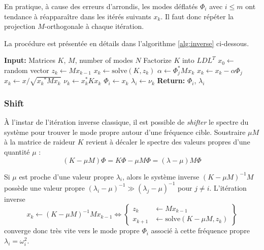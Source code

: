 \documentclass[12pt]{article}
\begin{document}
En pratique, à cause des erreurs d'arrondis, les modes déflatés $\Phi_i$ avec 
$i\leq m$ ont tendance à réapparaître dans les itérés suivants $x_k$. Il
faut donc répéter la projection $M$-orthogonale à chaque itération. 

La procédure est présentée en détails dans l'algorithme \ref{alg:inverse} 
ci-dessous.

\begin{algorithm}[H]
    \caption{Itération inverse avec déflation pour un problème généralisé $K\Phi = \omega^2 M \Phi$}
    \begin{algorithmic}[1]
    \State \textbf{Input:} Matrices $K$, $M$, number of modes $N$
    \State Factorize $K$ into $L D L^T$
     
        \State $ x_0 \gets $ random vector
         
            \State $z_k \gets M x_{k-1}$
            \State $x_k \gets \textrm{solve}(K, z_k)$
             
                \State $\alpha \gets \Phi_j^* M x_k$
                \State $x_k \gets x_k - \alpha \Phi_j$ 
            \EndFor
            \State $x_{k} \gets x / \sqrt{{x_k}^* M x_k}$ 
            \State $\nu_{k} \gets x_k^* K x_k$
        \EndFor
        \State $\Phi_i \gets x_k$ 
        \State $\lambda_i \gets \nu_k$ 
        \State \textbf{Return:} $\Phi_i$, $\lambda_i$
    \EndFor
    \end{algorithmic}
    \label{alg:inverse}
\end{algorithm}


\subsubsection{Shift}
À l'instar de l'itération inverse classique, il est possible de \textit{shifter}
le spectre du système pour trouver le mode propre autour d'une fréquence cible.
Soustraire $\mu M$ à la matrice de raideur $K$ revient à décaler le spectre des
valeurs propres d'une quantité $\mu$ :
\begin{equation}
    (K - \mu M) \Phi = K \Phi - \mu M \Phi = (\lambda - \mu) M \Phi
\end{equation}

Si $\mu$ est proche d'une valeur propre $\lambda_i$, alors le système inverse 
$(K - \mu M)^{-1} M $ possède une valeur propre 
$(\lambda_i - \mu)^{-1} \gg (\lambda_j - \mu)^{-1}$ pour $j \neq i$. 
L'itération inverse
\begin{equation}
    x_{k} \gets (K - \mu M)^{-1} M x_{k-1} \iff
    \left\{\begin{aligned}
        z_{k} &\gets M x_{k-1}\\
        x_{k+1} &\gets \textrm{solve}(K - \mu M, z_k)
    \end{aligned}\right\}
\end{equation}
converge donc très vite vers le mode propre $\Phi_i$ associé à cette 
fréquence propre $\lambda_i=\omega_i^2$.
\end{document}
